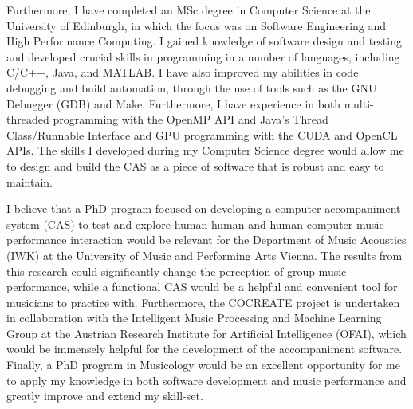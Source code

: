 \documentclass[12pt]{scrartcl}
\begin{document}
Furthermore, I have completed an MSc degree in Computer Science at the University of Edinburgh, in which the focus was on Software Engineering and High Performance Computing. I gained knowledge of software design and testing and developed crucial skills in programming in a number of languages, including C/C++, Java, and MATLAB. I have also improved my abilities in code debugging and build automation, through the use of tools such as the GNU Debugger (GDB) and Make. Furthermore, I have experience in both multi-threaded programming with the OpenMP API and Java’s Thread Class/Runnable Interface and GPU programming with the CUDA and OpenCL APIs. The skills I developed during my Computer Science degree would allow me to design and build the CAS as a piece of software that is robust and easy to maintain.

I believe that a PhD program focused on developing a computer accompaniment system (CAS) to test and explore human-human and human-computer music performance interaction would be relevant for the Department of Music Acoustics (IWK) at the University of Music and Performing Arts Vienna. The results from this research could significantly change the perception of group music performance, while a functional CAS would be a helpful and convenient tool for musicians to practice with. Furthermore, the COCREATE project is undertaken in collaboration with the Intelligent Music Processing and Machine Learning Group at the Austrian Research Institute for Artificial Intelligence (OFAI), which would be immensely helpful for the development of the accompaniment software. Finally, a PhD program in Musicology would be an excellent opportunity for me to apply my knowledge in both software development and music performance and greatly improve and extend my skill-set.




%
\end{document}
